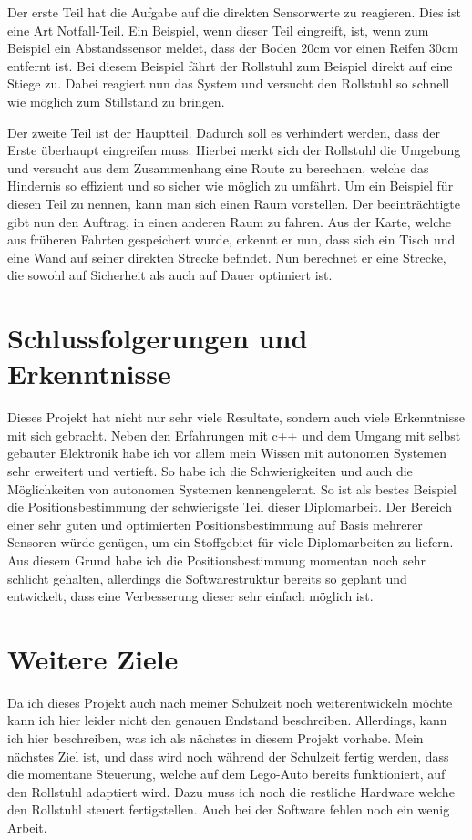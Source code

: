 Der erste Teil hat die Aufgabe auf die direkten Sensorwerte zu reagieren.
Dies ist eine Art Notfall-Teil.
Ein Beispiel, wenn dieser Teil eingreift, ist, wenn zum Beispiel ein Abstandssensor meldet, dass der Boden 20cm vor einen Reifen 30cm entfernt ist.
Bei diesem Beispiel fährt der Rollstuhl zum Beispiel direkt auf eine Stiege zu.
Dabei reagiert nun das System und versucht den Rollstuhl so schnell wie möglich zum Stillstand zu bringen.

Der zweite Teil ist der Hauptteil.
Dadurch soll es verhindert werden, dass der Erste überhaupt eingreifen muss.
Hierbei merkt sich der Rollstuhl die Umgebung und versucht aus dem Zusammenhang eine Route zu berechnen, welche das Hindernis so effizient und so sicher wie möglich zu umfährt.
Um ein Beispiel für diesen Teil zu nennen, kann man sich einen Raum vorstellen. 
Der beeinträchtigte gibt nun den Auftrag, in einen anderen Raum zu fahren.
Aus der Karte, welche aus früheren Fahrten gespeichert wurde, erkennt er nun, dass sich ein Tisch und eine Wand auf seiner direkten Strecke befindet.
Nun berechnet er eine Strecke, die sowohl auf Sicherheit als auch auf Dauer optimiert ist.


\section{Schlussfolgerungen und Erkenntnisse}
Dieses Projekt hat nicht nur sehr viele Resultate, sondern auch viele Erkenntnisse mit sich gebracht.
Neben den Erfahrungen mit c++ und dem Umgang mit selbst gebauter Elektronik habe ich vor allem mein Wissen mit autonomen Systemen sehr erweitert und vertieft.
So habe ich die Schwierigkeiten und auch die Möglichkeiten von autonomen Systemen kennengelernt.
So ist als bestes Beispiel die Positionsbestimmung der schwierigste Teil dieser Diplomarbeit.
Der Bereich einer sehr guten und optimierten Positionsbestimmung auf Basis mehrerer Sensoren würde genügen, um ein Stoffgebiet für viele Diplomarbeiten zu liefern.
Aus diesem Grund habe ich die Positionsbestimmung momentan noch sehr schlicht gehalten, allerdings die Softwarestruktur bereits so geplant und entwickelt, dass eine Verbesserung dieser sehr einfach möglich ist.



\section{Weitere Ziele}
Da ich dieses Projekt auch nach meiner Schulzeit noch weiterentwickeln möchte kann ich hier leider nicht den genauen Endstand beschreiben.
Allerdings, kann ich hier beschreiben, was ich als nächstes in diesem Projekt vorhabe.
Mein nächstes Ziel ist, und dass wird noch während der Schulzeit fertig werden, dass die momentane Steuerung, welche auf dem Lego-Auto bereits funktioniert, auf den Rollstuhl adaptiert wird.
Dazu muss ich noch die restliche Hardware welche den Rollstuhl steuert fertigstellen.
Auch bei der Software fehlen noch ein wenig Arbeit.

